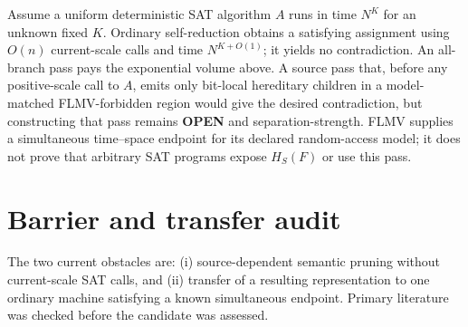 \documentclass[11pt]{article}
\newcommand{\OPEN}{\textbf{OPEN}}
\begin{document}
Assume a uniform deterministic SAT algorithm $A$ runs in time $N^K$ for an
unknown fixed $K$.  Ordinary self-reduction obtains a satisfying assignment
using $O(n)$ current-scale calls and time $N^{K+O(1)}$; it yields no
contradiction.  An all-branch pass pays the exponential volume above.  A
source pass that, before any positive-scale call to $A$, emits only
bit-local hereditary children in a model-matched FLMV-forbidden region would
give the desired contradiction, but constructing that pass remains \OPEN{}
and separation-strength.  FLMV supplies a simultaneous time--space endpoint
for its declared random-access model; it does not prove that arbitrary SAT
programs expose $H_S(F)$ or use this pass.

\section{Barrier and transfer audit}

The two current obstacles are: (i) source-dependent semantic pruning without
current-scale SAT calls, and (ii) transfer of a resulting representation to
one ordinary machine satisfying a known simultaneous endpoint.  Primary
literature was checked before the candidate was assessed.
\end{document}
